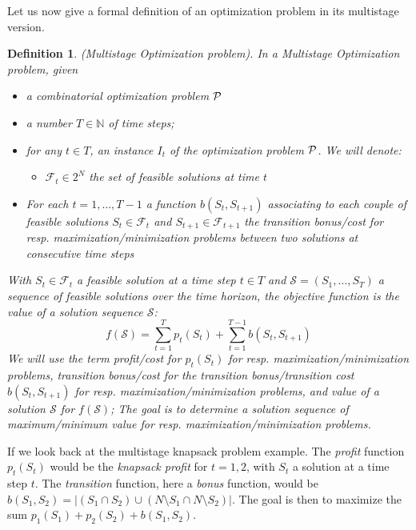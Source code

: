 \documentclass[a4paper]{book}
\newtheorem{definition}{Definition}
\begin{document}
Let us now give a formal definition of an optimization problem in its multistage version. 
\begin{definition}{\emph{(Multistage Optimization problem).}} In a Multistage Optimization problem, given 
\begin{itemize}
\item a combinatorial optimization problem $\cal P$ 
\item a number $T \in \mathbb{N}$ of time steps;
\item for any $t \in T$, an instance $I_t$ of the optimization problem $\cal P$. We will denote:
\begin{itemize}

\item $\mathcal{F}_t\in 2^N$ the set of feasible solutions at time $t$
\end{itemize} 

\item For each $t=1, \ldots, T-1$ a function $b(S_t,S_{t+1})$ associating to each couple of feasible solutions $S_t \in \mathcal{F}_t$ and $S_{t+1} \in \mathcal{F}_{t+1}$ the transition bonus/cost for resp. maximization/minimization problems between two solutions at consecutive time steps 
\end{itemize}
With $S_t \in \mathcal{F}_t$ a feasible solution at a time step $t \in T$ and $\mathcal{S}=(S_1,\dots,S_T)$ a sequence of feasible solutions over the time horizon, the objective function is the value of a solution sequence $\mathcal{S}$: $$f(\mathcal{S})=\sum_{t=1}^T p_t(S_t) + \sum_{t=1}^{T-1} b(S_t,S_{t+1})$$
We will use the term {\it profit}/cost for $ p_t(S_t)$ for resp. maximization/minimization problems, transition {\it bonus}/cost for the transition bonus/transition cost $b(S_t,S_{t+1})$ for resp. maximization/minimization problems, and {\it value} of a solution $\mathcal{S}$ for $f(\mathcal{S})$;
The goal is to determine a solution sequence of maximum/minimum value for resp. maximization/minimization problems. 

\end{definition}

If we look back at the {\sc multistage knapsack} problem example. The \textit{profit} function $p_t(S_t)$ would be the \textit{knapsack profit} for $t=1,2$, with $S_t$ a solution at a time step $t$. The \textit{transition} function, here a \textit{bonus} function, would be $b(S_1,S_{2})=|(S_1\cap S_2) \cup (N\setminus S_1 \cap N\setminus S_2)|$. The goal is then to maximize the sum $p_1(S_1)+p_2(S_2)+b(S_1,S_{2})$.
\end{document}
